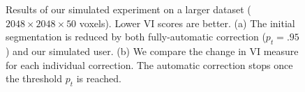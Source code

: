 
\begin{figure}[ht]
 \centering
    \hfill
	\caption{Results of our simulated experiment on a larger dataset ($2048\times2048\times50$ voxels). Lower VI scores are better. (a) The initial segmentation is reduced by both fully-automatic correction ($p_t=.95$) and our simulated user. (b) We compare the change in VI measure for each individual correction. The automatic correction stops once the threshold $p_t$ is reached.}
\label{fig:cylinderresults}
\end{figure}


